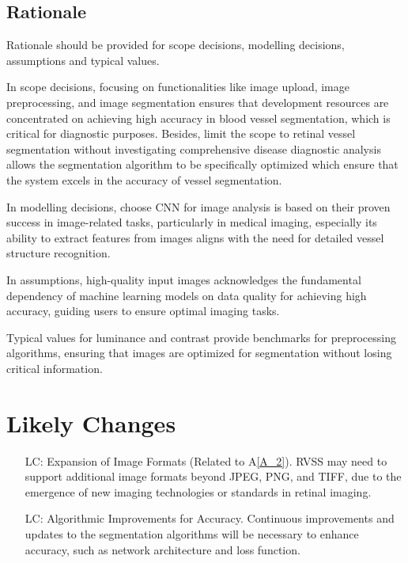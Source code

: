 \documentclass[12pt]{article}
\newcommand{\aref}[1]{A\ref{#1}}
\newcounter{lcnum} %
\begin{document}
\subsection{Rationale}
Rationale should be provided for scope decisions, modelling decisions, assumptions and typical values.

In scope decisions, focusing on functionalities like image upload, image preprocessing, and image segmentation ensures that development resources are concentrated on achieving high accuracy in blood vessel segmentation, which is critical for diagnostic purposes. Besides, limit the scope to retinal vessel segmentation without investigating comprehensive disease diagnostic analysis allows the segmentation algorithm to be specifically optimized which ensure that the system excels in the accuracy of vessel segmentation.

In modelling decisions, choose CNN for image analysis is based on their proven success in image-related tasks, particularly in medical imaging, especially its ability to extract features from images aligns with the need for detailed vessel structure recognition. 

In assumptions, high-quality input images acknowledges the fundamental dependency of machine learning models on data quality for achieving high accuracy, guiding users to ensure optimal imaging tasks. 

Typical values for luminance and contrast provide benchmarks for preprocessing algorithms, ensuring that images are optimized for segmentation without losing critical information.


\section{Likely Changes}    

\noindent 
\begin{itemize}

\item[LC\refstepcounter{lcnum}\thelcnum\label{LC_1}:] Expansion of Image Formats (Related to \aref{A_2}). RVSS may need to support additional image formats beyond JPEG, PNG, and TIFF, due to the emergence of new imaging technologies or standards in retinal imaging.


\item[LC\refstepcounter{lcnum}\thelcnum\label{LC_2}:]  Algorithmic Improvements for Accuracy. Continuous improvements and updates to the segmentation algorithms will be necessary to enhance accuracy, such as network architecture and loss function.
\end{itemize}
\end{document}
